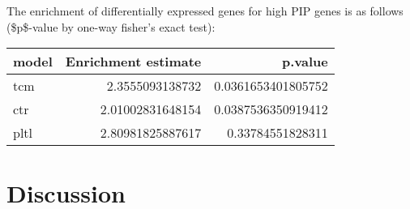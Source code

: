 The enrichment of differentially expressed genes for high PIP genes is as follows (\$p\$-value by one-way fisher's exact test):


\begin{center}
\begin{tabular}{lrr}
model & Enrichment estimate & p.value\\
\hline
tcm & 2.3555093138732 & 0.0361653401805752\\
ctr & 2.01002831648154 & 0.0387536350919412\\
pltl & 2.80981825887617 & 0.33784551828311\\
\end{tabular}
\end{center}


\section*{Discussion}
\label{sec:org53f1196}

